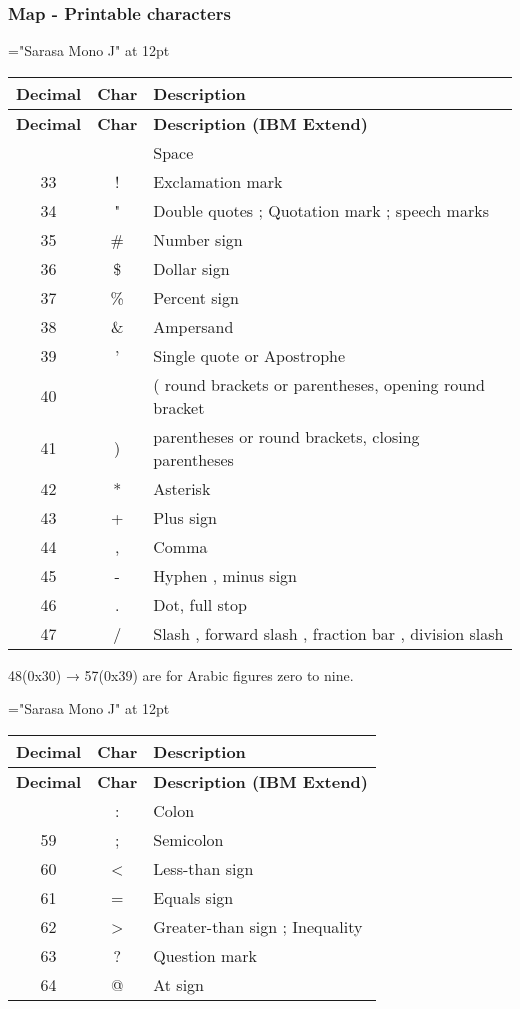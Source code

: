 \subsubsection{Map - Printable characters}

{\font\rm="Sarasa Mono J" at 12pt \rm 
\begin{longtable}{|c|c|l|}
	\hline
	\textbf{Decimal} & \textbf{Char} & \textbf{Description} \\
	\hline\endfirsthead\hline
	\textbf{Decimal} & \textbf{Char} & \textbf{Description (IBM Extend)} \\
	\hline\endhead\hline\endfoot\hline\endlastfoot
32 &   & Space \\\hline
33 & ! & Exclamation mark \\\hline
34 & " & Double quotes ; Quotation mark ; speech marks \\\hline
35 & \#& Number sign \\\hline
36 & \$& Dollar sign \\\hline
37 & \%& Percent sign \\\hline
38 & \&& Ampersand \\\hline
39 & ' & Single quote or Apostrophe \\\hline
40 &   & ( round brackets or parentheses, opening round bracket \\\hline
41 & ) & parentheses or round brackets, closing parentheses \\\hline
42 & * & Asterisk \\\hline
43 & + & Plus sign \\\hline
44 & , & Comma \\\hline
45 & - & Hyphen , minus sign \\\hline
46 & . & Dot, full stop \\\hline
47 & / & Slash , forward slash , fraction bar , division slash \\\hline
\end{longtable}
}

48(0x30) → 57(0x39) are for Arabic figures zero to nine. 

{\font\rm="Sarasa Mono J" at 12pt \rm 
\begin{longtable}{|c|c|l|}
	\hline
	\textbf{Decimal} & \textbf{Char} & \textbf{Description} \\
	\hline\endfirsthead\hline
	\textbf{Decimal} & \textbf{Char} & \textbf{Description (IBM Extend)} \\
	\hline\endhead\hline\endfoot\hline\endlastfoot
58 & : & Colon \\\hline
59 & ; & Semicolon \\\hline
60 & < & Less-than sign \\\hline
61 & = & Equals sign \\\hline
62 & > & Greater-than sign ; Inequality \\\hline
63 & ? & Question mark \\\hline
64 & @ & At sign \\\hline
\end{longtable}
}

